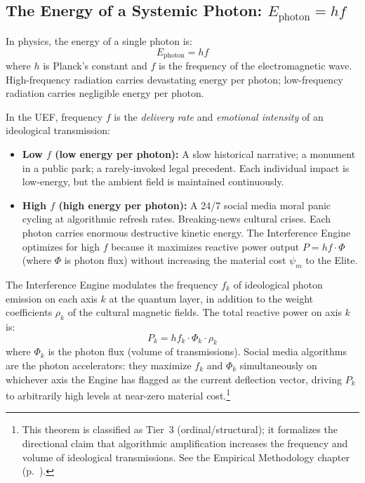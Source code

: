 \subsection{The Energy of a Systemic Photon: $E_{\text{photon}} = hf$}

In physics, the energy of a single photon is:
\begin{equation}\label{eq:15.qed-photon-energy}
\boxed{E_{\text{photon}} = hf}
\end{equation}
where $h$ is Planck's constant and $f$ is the frequency of the electromagnetic wave. High-frequency radiation carries devastating energy per photon; low-frequency radiation carries negligible energy per photon.

\begin{definition}
In the UEF, frequency $f$ is the \emph{delivery rate} and \emph{emotional intensity} of an ideological transmission:
\begin{itemize}
\item \textbf{Low $f$ (low energy per photon):} A slow historical narrative; a monument in a public park; a rarely-invoked legal precedent. Each individual impact is low-energy, but the ambient field is maintained continuously.
\item \textbf{High $f$ (high energy per photon):} A 24/7 social media moral panic cycling at algorithmic refresh rates. Breaking-news cultural crises. Each photon carries enormous destructive kinetic energy. The Interference Engine optimizes for high $f$ because it maximizes reactive power output $P = hf \cdot \Phi$ (where $\Phi$ is photon flux) without increasing the material cost $\psi_m$ to the Elite.
\end{itemize}
\end{definition}

\begin{theorem}
The Interference Engine modulates the frequency $f_k$ of ideological photon emission on each axis $k$ at the quantum layer, in addition to the weight coefficients $\rho_k$ of the cultural magnetic fields. The total reactive power on axis $k$ is:
\begin{equation}\label{eq:15.qed-reactive-power}
P_k = h f_k \cdot \Phi_k \cdot \rho_k
\end{equation}
where $\Phi_k$ is the photon flux (volume of transmissions). Social media algorithms are the photon accelerators: they maximize $f_k$ and $\Phi_k$ simultaneously on whichever axis the Engine has flagged as the current deflection vector, driving $P_k$ to arbitrarily high levels at near-zero material cost.\footnote{This theorem is classified as Tier~3 (ordinal/structural); it formalizes the directional claim that algorithmic amplification increases the frequency and volume of ideological transmissions. See the Empirical Methodology chapter (p.~\pageref{ch:empirical_methodology}).}
\end{theorem}

